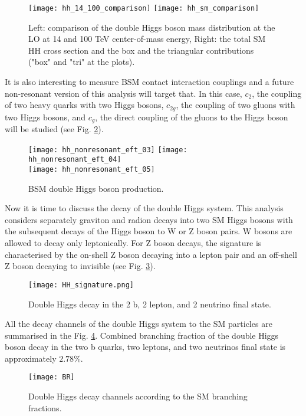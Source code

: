 \begin{figure}[H]
  \centering 
    \texttt{[image: hh\_14\_100\_comparison]}
    \texttt{[image: hh\_sm\_comparison]}
    \caption{Left: comparison of the double Higgs boson mass distribution at the LO at 14 and 100 TeV center-of-mass energy, Right: the total SM HH cross section and the box and the triangular contributions ("box" and "tri" at the plots).}
    \label{hh_comparison}
\end{figure}


It is also interesting to measure BSM contact interaction couplings and a future non-resonant version of this analysis will target that. In this case, $c_2$, the coupling of two heavy quarks with two Higgs bosons, $c_{2g}$, the coupling of two gluons with two Higgs bosons, and $c_g$, the direct coupling of the gluons to the Higgs boson will be studied (see Fig. \ref{BSM_HH}). 

\begin{figure}[H]
  \centering
    \texttt{[image: hh\_nonresonant\_eft\_03]}
    \texttt{[image: hh\_nonresonant\_eft\_04]}\\
     \texttt{[image: hh\_nonresonant\_eft\_05]}
    \caption{BSM double Higgs boson production.}
    \label{BSM_HH}
\end{figure}


Now it is time to discuss the decay of the double Higgs system. 
This analysis considers separately graviton and radion decays into two SM Higgs bosons with the subsequent decays of the Higgs boson to W or Z boson pairs. W bosons are allowed to decay only leptonically. For Z boson decays, the signature is characterised by the on-shell Z boson decaying into a lepton pair and an off-shell Z boson decaying to invisible (see Fig. \ref{HH_signature}). 

\begin{figure}[H]
  \centering
    \texttt{[image: HH\_signature.png]}
    \caption{Double Higgs decay in the 2 b, 2 lepton, and 2 neutrino final state. }
    \label{HH_signature}
\end{figure}

All the decay channels of the double Higgs system to the SM particles are summarised in the Fig. \ref{BR}. Combined branching fraction of the double Higgs boson decay in the two b quarks, two leptons, and two neutrinos final state is approximately $2.78 \%$. 

\begin{figure}[H]
  \centering
    \texttt{[image: BR]}
    \caption{Double Higgs decay channels according to the SM branching fractions.}
    \label{BR}
\end{figure}



